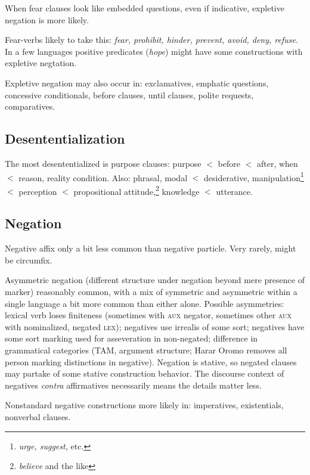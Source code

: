 \documentclass[11pt]{article}
\newcommand{\E}[1]{\textit{#1}}   %
\newcommand{\I}[1]{\textsc{#1}}   %
\begin{document}
When fear clauses look like embedded questions, even if indicative,
expletive negation is more likely.

Fear-verbs likely to take this: \E{fear, prohibit, hinder, prevent,
  avoid, deny, refuse}.  In a few languages positive predicates
(\E{hope}) might have some constructions with expletive negtation.

Expletive negation may also occur in: exclamatives, emphatic
questions, concessive conditionals, before clauses, until clauses,
polite requests, comparatives.


\subsection{Desententialization}
The most desententialized is purpose clauses: purpose $<$ before $<$
after, when $<$ reason, reality condition.  Also: phrasal, modal $<$
desiderative, manipulation\footnote{\textit{urge, suggest,} etc.} $<$
perception $<$ propositional attitude,\footnote{\textit{believe} and
the like} knowledge $<$ utterance.



\subsection{Negation}
Negative affix only a bit less common than negative particle.  Very
rarely, might be circumfix.

Asymmetric negation (different structure under negation beyond mere
presence of marker) reasonably common, with a mix of symmetric and
asymmetric within a single language a bit more common than either
alone.  Possible asymmetries: lexical verb loses finiteness (sometimes
with \I{aux} negator, sometimes other \I{aux} with nominalized,
negated \I{lex}); negatives use irrealis of some sort; negatives have
some sort marking used for asseveration in non-negated; difference in
grammatical categories (TAM, argument structure; Harar Oromo removes
all person marking distinctions in negative).  Negation is stative, so
negated clauses may partake of some stative construction behavior.
The discourse context of negatives \E{contra} affirmatives necessarily
means the details matter less.

Nonstandard negative constructions more likely in: imperatives,
existentials, nonverbal clauses.
\end{document}
